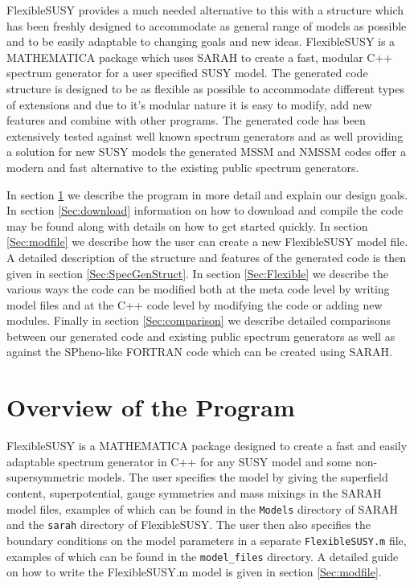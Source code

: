 \documentclass[final,3p,11pt,pdflatex]{elsarticle}
\newcommand{\sarah}{SARAH\xspace}
\newcommand{\fs}{FlexibleSUSY\xspace}
\newcommand{\code}[1]{\lstinline|#1|}  %
\begin{document}
\fs provides a much needed alternative to this with a structure which
has been freshly designed to accommodate as general range of models as
possible and to be easily adaptable to changing goals and new
ideas. \fs is a MATHEMATICA package which uses \sarah to create a
fast, modular C++ spectrum generator for a user specified SUSY model.
The generated code structure is designed to be as flexible as possible
to accommodate different types of extensions and due to it's modular
nature it is easy to modify, add new features and combine with other
programs.  The generated code has been extensively tested against well
known spectrum generators and as well providing a solution for new
SUSY models the generated MSSM and NMSSM codes offer a modern and fast
alternative to the existing public spectrum generators.

In section \ref{Sec:Program} we describe the program in more detail
and explain our design goals.  In section \ref{Sec:download}
information on how to download and compile the code may be found along
with details on how to get started quickly.  In section
\ref{Sec:modfile} we describe how the user can create a new
FlexibleSUSY model file. A detailed description of the structure and
features of the generated code is then given in section
\ref{Sec:SpecGenStruct}.  In section \ref{Sec:Flexible} we describe
the various ways the code can be modified both at the meta code level
by writing model files and at the C++ code level by modifying the code
or adding new modules. Finally in section \ref{Sec:comparison} we
describe detailed comparisons between our generated code and existing
public spectrum generators as well as against the SPheno-like FORTRAN
code which can be created using SARAH.


\section{Overview of the Program}
\label{Sec:Program}
\fs is a MATHEMATICA package designed to create a fast and easily
adaptable spectrum generator in C++ for any SUSY model and some
non-supersymmetric models.  The user specifies the model by giving the
superfield content, superpotential, gauge symmetries and mass mixings
in the \sarah model files, examples of which can be found in the
\code{Models} directory of \sarah and the \code{sarah} directory of
FlexibleSUSY.  The user then also specifies the boundary conditions on
the model parameters in a separate \code{FlexibleSUSY.m} file,
examples of which can be found in the \code{model_files} directory. A
detailed guide on how to write the FlexibleSUSY.m model is given in
section \ref{Sec:modfile}.
\end{document}
